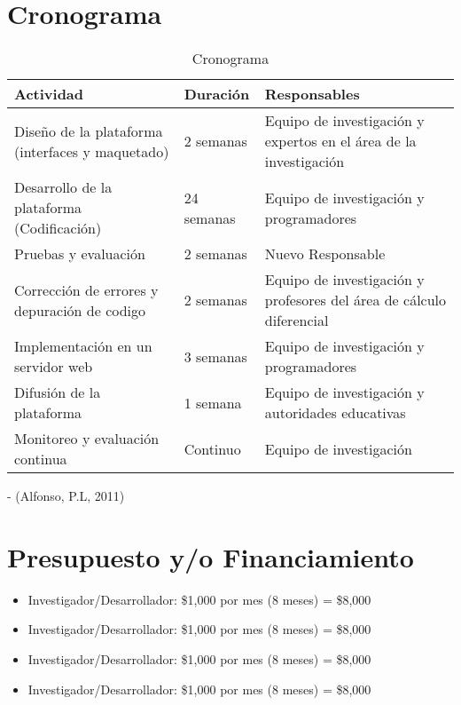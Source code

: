 \documentclass{article}
\begin{document}
\section{Cronograma}
\begin{table}[h]

  \centering
  \begin{tabular}{|p{4cm}|p{3cm}|p{5cm}|} 
  \hline 
  \textbf{Actividad} & \textbf{Duración} & \textbf{Responsables} \\ 
  \hline 
  Diseño de la plataforma (interfaces y maquetado) & 2 semanas & Equipo de investigación y expertos en el área de la investigación\\ %
  \hline 
  Desarrollo de la plataforma (Codificación) & 24 semanas & Equipo de investigación y programadores \\ %
  \hline 
  Pruebas y evaluación  & 2 semanas & Nuevo Responsable \\ 
  \hline 
  Corrección de errores y depuración de codigo & 2 semanas & Equipo de investigación y profesores del área de cálculo diferencial\\ %
  \hline
  Implementación en un servidor web &3 semanas &Equipo de investigación y programadores\\
  \hline
  Difusión de la plataforma & 1 semana & Equipo de investigación y autoridades educativas\\
  \hline
  Monitoreo y evaluación continua & Continuo & Equipo de investigación\\
  \hline

  \end{tabular}
  \caption{Cronograma} 
  \label{tabla_ejemplo} 
  \cite{Alfonso} - (Alfonso, P.L, 2011)
\end{table}
\section{Presupuesto y/o Financiamiento}
\begin{itemize}
  \item Investigador/Desarrollador: \$1,000 por mes (8 meses) = \$8,000
  \item Investigador/Desarrollador: \$1,000 por mes (8 meses) = \$8,000
  \item Investigador/Desarrollador: \$1,000 por mes (8 meses) = \$8,000
  \item Investigador/Desarrollador: \$1,000 por mes (8 meses) = \$8,000
\end{itemize} 
\end{document}

